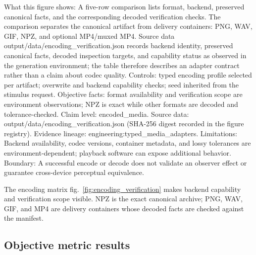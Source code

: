 \documentclass[
  english,
]{article}
\begin{document}
What this figure shows: A five-row comparison lists format, backend,
preserved canonical facts, and the corresponding decoded verification
checks. The comparison separates the canonical artifact from delivery
containers: PNG, WAV, GIF, NPZ, and optional MP4/muxed MP4. Source data
output/data/encoding\_verification.json records backend identity,
preserved canonical facts, decoded inspection targets, and capability
status as observed in the generation environment; the table therefore
describes an adapter contract rather than a claim about codec quality.
Controls: typed encoding profile selected per artifact; overwrite and
backend capability checks; seed inherited from the stimulus request.
Objective facts: format availability and verification scope are
environment observations; NPZ is exact while other formats are decoded
and tolerance-checked. Claim level: encoded\_media. Source data:
output/data/encoding\_verification.json (SHA-256 digest recorded in the
figure registry). Evidence lineage: engineering:typed\_media\_adapters.
Limitations: Backend availability, codec versions, container metadata,
and lossy tolerances are environment-dependent; playback software can
expose additional behavior. Boundary: A successful encode or decode does
not validate an observer effect or guarantee cross-device perceptual
equivalence.

The encoding matrix fig.~\ref{fig:encoding_verification} makes backend
capability and verification scope visible. NPZ is the exact canonical
archive; PNG, WAV, GIF, and MP4 are delivery containers whose decoded
facts are checked against the manifest.

\subsection{Objective metric
results}\label{sec:objective_metric_results}
\end{document}
